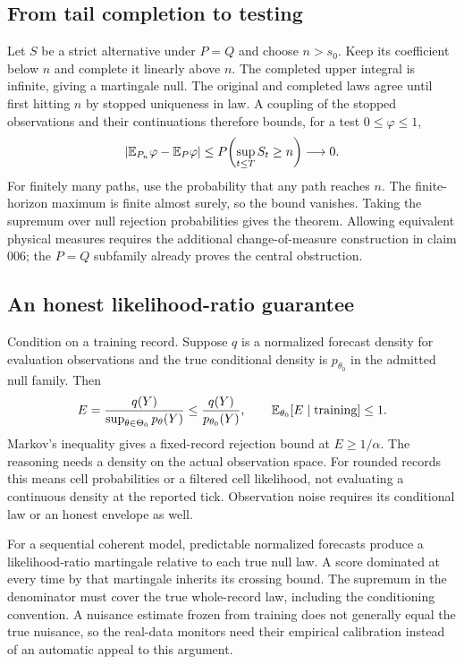 \subsection{From tail completion to testing}
Let $S$ be a strict alternative under $P=Q$ and choose $n>s_0$.
Keep its coefficient below $n$ and complete it linearly above $n$.
The completed upper integral is infinite, giving a martingale null.
The original and completed laws agree until first hitting $n$ by
stopped uniqueness in law. A coupling of the stopped observations and
their continuations therefore bounds, for a test $0\leq\varphi\leq1$,
\[
 |\mathbb{E}_{P_n}\varphi-\mathbb{E}_P\varphi|
 \leq P\!\left(\sup_{t\leq T}S_t\geq n\right)
 \longrightarrow0.
\]
For finitely many paths, use the probability that any path reaches
$n$. The finite-horizon maximum is finite almost surely, so the bound
vanishes. Taking the supremum over null rejection probabilities gives
the theorem. Allowing equivalent physical measures requires the
additional change-of-measure construction in claim 006; the
$P=Q$ subfamily already proves the central obstruction.

\subsection{An honest likelihood-ratio guarantee}
Condition on a training record. Suppose $q$ is a normalized forecast
density for evaluation observations and the true conditional density
is $p_{\theta_0}$ in the admitted null family. Then
\[
 E=\frac{q(Y)}{\sup_{\theta\in\Theta_0}p_\theta(Y)}
       \leq\frac{q(Y)}{p_{\theta_0}(Y)},\qquad
 \mathbb{E}_{\theta_0}[E\mid\text{training}]\leq1.
\]
Markov's inequality gives a fixed-record rejection bound at
$E\geq1/\alpha$. The reasoning needs a density on the actual
observation space. For rounded records this means cell probabilities
or a filtered cell likelihood, not evaluating a continuous density
at the reported tick. Observation noise requires its conditional law
or an honest envelope as well.

For a sequential coherent model, predictable normalized forecasts
produce a likelihood-ratio martingale relative to each true null
law. A score dominated at every time by that martingale inherits its
crossing bound. The supremum in the denominator must cover the true
whole-record law, including the conditioning convention. A nuisance
estimate frozen from training does not generally equal the true
nuisance, so the real-data monitors need their empirical calibration
instead of an automatic appeal to this argument.

